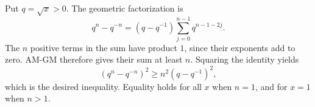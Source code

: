 Put $q=\sqrt x>0$. The geometric factorization is
\[
q^n-q^{-n}=(q-q^{-1})\sum_{j=0}^{n-1}q^{n-1-2j}.
\]
The $n$ positive terms in the sum have product $1$, since their exponents add to zero. AM-GM therefore gives their sum at least $n$. Squaring the identity yields
\[
(q^n-q^{-n})^2\ge n^2(q-q^{-1})^2,
\]
which is the desired inequality. Equality holds for all $x$ when $n=1$, and for $x=1$ when $n>1$.

